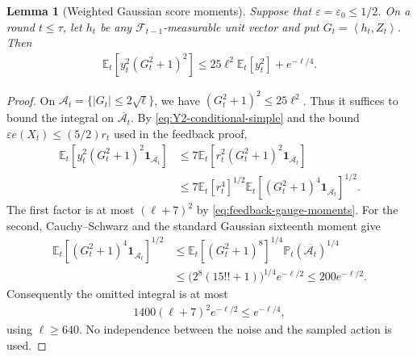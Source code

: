 \documentclass{article}
\newtheorem{lemma}[lemma]{Lemma}
\newcommand{\E}{\mathbb E}
\newcommand{\Pp}{\mathbb P}
\newcommand{\F}{\mathcal F}
\newcommand{\1}{\mathbf 1}
\newcommand{\eps}{\varepsilon}
\newcommand{\ip}[2]{\left\langle #1,#2\right\rangle}
\begin{document}
\begin{lemma}[Weighted Gaussian score moments]
    \label{lem:gaussian-score-localisation}
    Suppose that $\eps=\eps_0\leq1/2$. On a round $t\leq\tau$, let
    $h_t$ be any $\F_{t-1}$-measurable unit vector and put
    $G_t=\ip{h_t}{Z_t}$. Then
    \begin{align}
        \E_t[y_t^2(G_t^2+1)^2]
        \leq25\ell^2\E_t[y_t^2]+e^{-\ell/4}.
        \label{eq:H-score-second-moment}
    \end{align}
\end{lemma}
\begin{proof}
    On $\mathcal A_t=\{|G_t|\leq2\sqrt\ell\}$, we have
    $(G_t^2+1)^2\leq25\ell^2$. Thus it suffices to bound the integral on
    $\overline{\mathcal A_t}$. By \eqref{eq:Y2-conditional-simple} and the bound
    $\eps e(X_t)\leq(5/2)r_t$ used in the feedback proof,
    \begin{align}
        \E_t[y_t^2(G_t^2+1)^2\1_{\overline{\mathcal A_t}}]
         & \leq7\E_t[r_t^2(G_t^2+1)^2\1_{\overline{\mathcal A_t}}]
        \\
         & \leq7\E_t[r_t^4]^{1/2}
        \E_t[(G_t^2+1)^4\1_{\overline{\mathcal A_t}}]^{1/2}.
    \end{align}
    The first factor is at most $(\ell+7)^2$ by
    \eqref{eq:feedback-gauge-moments}. For the second, Cauchy--Schwarz and
    the standard Gaussian sixteenth moment give
    \begin{align}
        \E_t[(G_t^2+1)^4\1_{\overline{\mathcal A_t}}]^{1/2}
         & \leq\E_t[(G_t^2+1)^8]^{1/4}\Pp_t(\overline{\mathcal A_t})^{1/4}
        \\
         & \leq\bigl(2^8(15!!+1)\bigr)^{1/4}e^{-\ell/2}
        \leq200e^{-\ell/2}.
    \end{align}
    Consequently the omitted integral is at most
    \begin{align}
        1400(\ell+7)^2e^{-\ell/2}\leq e^{-\ell/4},
    \end{align}
    using $\ell\geq640$. No independence between the noise and the
    sampled action is used.
\end{proof}
\end{document}
